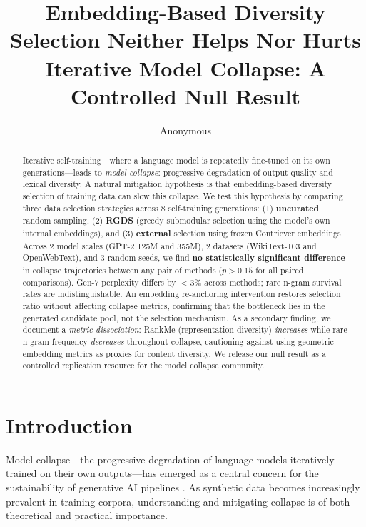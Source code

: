 \documentclass[11pt]{article}
\title{Embedding-Based Diversity Selection Neither Helps Nor Hurts\\Iterative Model Collapse: A Controlled Null Result}
\author{Anonymous}
\date{}
\begin{document}
\maketitle

\begin{abstract}
Iterative self-training---where a language model is repeatedly fine-tuned on its own generations---leads to \emph{model collapse}: progressive degradation of output quality and lexical diversity. A natural mitigation hypothesis is that embedding-based diversity selection of training data can slow this collapse. We test this hypothesis by comparing three data selection strategies across 8 self-training generations: (1) \textbf{uncurated} random sampling, (2) \textbf{RGDS} (greedy submodular selection using the model's own internal embeddings), and (3) \textbf{external} selection using frozen Contriever embeddings. Across 2 model scales (GPT-2 125M and 355M), 2 datasets (WikiText-103 and OpenWebText), and 3 random seeds, we find \textbf{no statistically significant difference} in collapse trajectories between any pair of methods ($p > 0.15$ for all paired comparisons). Gen-7 perplexity differs by $< 3\%$ across methods; rare n-gram survival rates are indistinguishable. An embedding re-anchoring intervention restores selection ratio without affecting collapse metrics, confirming that the bottleneck lies in the generated candidate pool, not the selection mechanism. As a secondary finding, we document a \emph{metric dissociation}: RankMe (representation diversity) \emph{increases} while rare n-gram frequency \emph{decreases} throughout collapse, cautioning against using geometric embedding metrics as proxies for content diversity. We release our null result as a controlled replication resource for the model collapse community.
\end{abstract}

\section{Introduction}

Model collapse---the progressive degradation of language models iteratively trained on their own outputs---has emerged as a central concern for the sustainability of generative AI pipelines \citep{shumailov2024nature,alemohammad2024selfconsuming,dohmatob2024tale}. As synthetic data becomes increasingly prevalent in training corpora, understanding and mitigating collapse is of both theoretical and practical importance.
\end{document}
